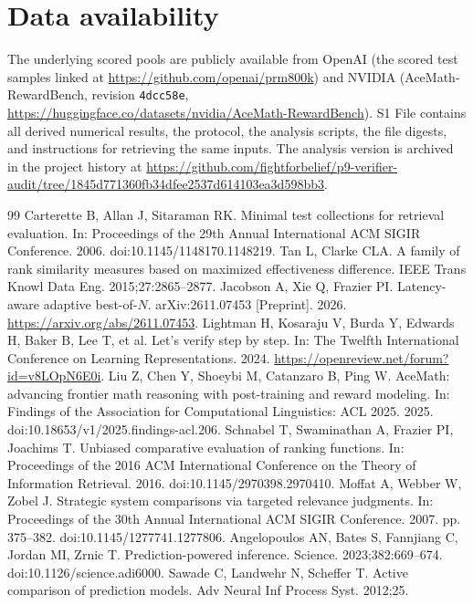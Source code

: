 \documentclass[10pt,letterpaper]{article}
\begin{document}
\section*{Data availability}
The underlying scored pools are publicly available from OpenAI (the scored test samples linked at \url{https://github.com/openai/prm800k}) and NVIDIA (AceMath-RewardBench, revision \texttt{4dcc58e}, \url{https://huggingface.co/datasets/nvidia/AceMath-RewardBench}). S1 File contains all derived numerical results, the protocol, the analysis scripts, the file digests, and instructions for retrieving the same inputs. The analysis version is archived in the project history at \url{https://github.com/fightforbelief/p9-verifier-audit/tree/1845d771360fb34dfee2537d614103ea3d598bb3}.
\begin{thebibliography}{99}
 Carterette B, Allan J, Sitaraman RK. Minimal test collections for retrieval evaluation. In: Proceedings of the 29th Annual International ACM SIGIR Conference. 2006. doi:10.1145/1148170.1148219.
 Tan L, Clarke CLA. A family of rank similarity measures based on maximized effectiveness difference. IEEE Trans Knowl Data Eng. 2015;27:2865--2877.
 Jacobson A, Xie Q, Frazier PI. Latency-aware adaptive best-of-$N$. arXiv:2611.07453 [Preprint]. 2026. \url{https://arxiv.org/abs/2611.07453}.
 Lightman H, Kosaraju V, Burda Y, Edwards H, Baker B, Lee T, et al. Let's verify step by step. In: The Twelfth International Conference on Learning Representations. 2024. \url{https://openreview.net/forum?id=v8LOpN6E0i}.
 Liu Z, Chen Y, Shoeybi M, Catanzaro B, Ping W. AceMath: advancing frontier math reasoning with post-training and reward modeling. In: Findings of the Association for Computational Linguistics: ACL 2025. 2025. doi:10.18653/v1/2025.findings-acl.206.
 Schnabel T, Swaminathan A, Frazier PI, Joachims T. Unbiased comparative evaluation of ranking functions. In: Proceedings of the 2016 ACM International Conference on the Theory of Information Retrieval. 2016. doi:10.1145/2970398.2970410.
 Moffat A, Webber W, Zobel J. Strategic system comparisons via targeted relevance judgments. In: Proceedings of the 30th Annual International ACM SIGIR Conference. 2007. pp. 375--382. doi:10.1145/1277741.1277806.
 Angelopoulos AN, Bates S, Fannjiang C, Jordan MI, Zrnic T. Prediction-powered inference. Science. 2023;382:669--674. doi:10.1126/science.adi6000.
 Sawade C, Landwehr N, Scheffer T. Active comparison of prediction models. Adv Neural Inf Process Syst. 2012;25.

\end{thebibliography}
\end{document}
